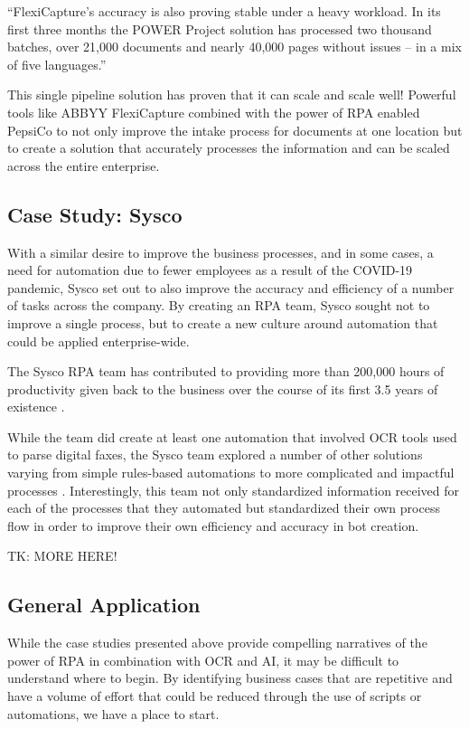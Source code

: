\documentclass[conference]{IEEEtran}
\begin{document}
``FlexiCapture's accuracy is also proving stable under a heavy workload. In its first three months the POWER Project solution has processed two thousand batches, over 21,000 documents and nearly 40,000 pages without issues – in a mix of five languages.'' \cite{pepsico}

This single pipeline solution has proven that it can scale and scale well! Powerful tools like ABBYY FlexiCapture combined with the power of RPA enabled PepsiCo to not only improve the intake process for documents at one location but to create a solution that accurately processes the information and can be scaled across the entire enterprise.

\subsection{Case Study: Sysco}
With a similar desire to improve the business processes, and in some cases, a need for automation due to fewer employees as a result of the COVID-19 pandemic, Sysco set out to also improve the accuracy and efficiency of a number of tasks across the company. By creating an RPA team, Sysco sought not to improve a single process, but to create a new culture around automation that could be applied enterprise-wide.

The Sysco RPA team has contributed to providing more than 200,000 hours of productivity given back to the business over the course of its first 3.5 years of existence \cite{bpcafe2021sysco:slides}.

While the team did create at least one automation that involved OCR tools used to parse digital faxes, the Sysco team explored a number of other solutions varying from simple rules-based automations to more complicated and impactful processes \cite{bpcafe2021sysco}. Interestingly, this team not only standardized information received for each of the processes that they automated but standardized their own process flow in order to improve their own efficiency and accuracy in bot creation.

TK: MORE HERE!

\subsection{General Application}
While the case studies presented above provide compelling narratives of the power of RPA in combination with OCR and AI, it may be difficult to understand where to begin. By identifying business cases that are repetitive and have a volume of effort that could be reduced through the use of scripts or automations, we have a place to start.
\end{document}
